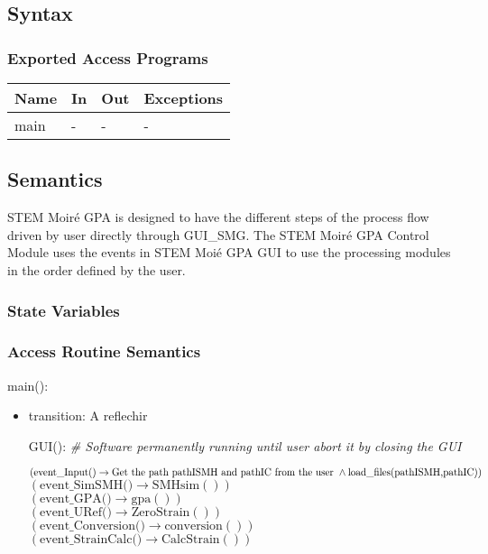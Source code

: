 \documentclass[12pt, titlepage]{article}
\newcommand{\progname}{STEM Moir{\'e} GPA}
\begin{document}
\subsection{Syntax}

\subsubsection{Exported Access Programs}

\begin{center}
\begin{tabular}{p{2cm} p{4cm} p{4cm} p{2cm}}
\hline
\textbf{Name} & \textbf{In} & \textbf{Out} & \textbf{Exceptions} \\
\hline
main & - & - & - \\
\hline
\end{tabular}
\end{center}

\subsection{Semantics}

\progname{} is designed to have the different steps of the process flow driven by user directly through GUI{\_}SMG. The STEM Moir{\'e} GPA Control Module uses the events in STEM Moi{\'e} GPA GUI to use the processing modules in the order defined by the user.

\subsubsection{State Variables}


\subsubsection{Access Routine Semantics}

\noindent main():
\begin{itemize}
\item transition: A reflechir 

GUI():
\noindent\textit{{\#} Software permanently running until user abort it by closing the GUI} \medskip

$(\text{event{\_}Input()} \\ \rightarrow \text{Get the path pathISMH and pathIC from the user} \  \wedge \\ \text{load{\_}files(pathISMH,pathIC)})$\\
$(\text{event{\_}SimSMH()} \rightarrow \text{SMHsim}())$\\
$(\text{event{\_}GPA()} \rightarrow \text{gpa}())$\\
$(\text{event{\_}URef()} \rightarrow \text{ZeroStrain}())$\\
$(\text{event{\_}Conversion()} \rightarrow \text{conversion}())$\\
$(\text{event{\_}StrainCalc()} \rightarrow \text{CalcStrain}())$\\

\end{itemize}
\end{document}

